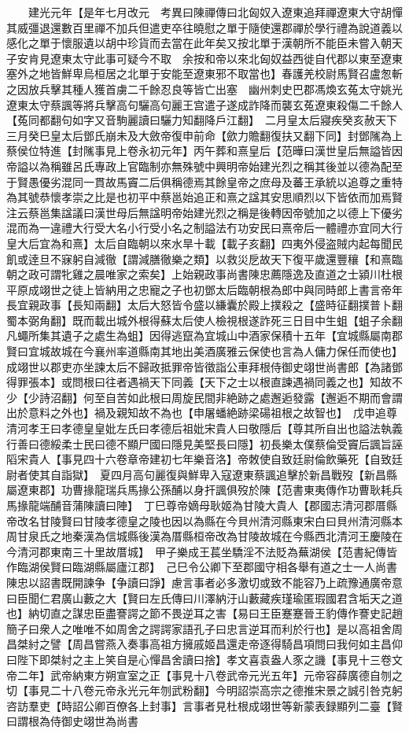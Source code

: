 　　建光元年【是年七月改元　考異曰陳禪傳曰北匈奴入遼東追拜禪遼東大守胡憚其威彊退還數百里禪不加兵但遣吏卒往曉慰之單于隨使還郡禪於學行禮為說道義以感化之單于懷服遺以胡中珍貨而去當在此年矣又按北單于漢朝所不能臣未嘗入朝天子安肯見遼東太守此事可疑今不取　余按和帝以來北匈奴益西徙自代郡以東至遼東塞外之地皆鮮卑烏桓居之北單于安能至遼東邪不取當也】春護羌校尉馬賢召盧怱斬之因放兵擊其種人獲首虜二千餘忍良等皆亡出塞　幽州刺史巴郡馮煥玄菟太守姚光遼東太守蔡諷等將兵擊高句驪高句麗王宫遣子遂成詐降而襲玄菟遼東殺傷二千餘人【菟同都翻句如字又音駒麗讀曰驪力知翻降戶江翻】　二月皇太后寢疾癸亥赦天下三月癸巳皇太后鄧氏崩未及大斂帝復申前命【歛力贍翻復扶又翻下同】封鄧隲為上蔡侯位特進【封隲事見上卷永初元年】丙午葬和熹皇后【范曄曰漢世皇后無謚皆因帝謚以為稱雖呂氏專政上官臨制亦無殊號中興明帝始建光烈之稱其後並以德為配至于賢愚優劣混同一貫故馬竇二后俱稱德焉其餘皇帝之庶母及蕃王承統以追尊之重特為其號恭懷孝崇之比是也初平中蔡邕始追正和熹之諡其安思順烈以下皆依而加焉賢注云蔡邕集諡議曰漢世母后無諡明帝始建光烈之稱是後轉因帝號加之以德上下優劣混而為一違禮大行受大名小行受小名之制謚法冇功安民曰熹帝后一體禮亦宜同大行皇大后宜為和熹】太后自臨朝以來水旱十載【載子亥翻】四夷外侵盗賊内起每聞民飢或逹旦不寐躬自減徹【謂減膳徹樂之類】以救災戹故天下復平歲還豐穰【和熹臨朝之政可謂牝雞之晨唯家之索矣】上始親政事尚書陳忠薦隱逸及直道之士潁川杜根平原成翊世之徒上皆納用之忠寵之子也初鄧太后臨朝根為郎中與同時郎上書言帝年長宜親政事【長知兩翻】太后大怒皆令盛以縑囊於殿上撲殺之【盛時征翻撲普卜翻蜀本弼角翻】既而載出城外根得蘇太后使人檢視根遂詐死三日目中生蛆【蛆子余翻凡蠅所集其遺子之處生為蛆】因得逃竄為宜城山中酒家保積十五年【宜城縣屬南郡賢曰宜城故城在今襄州率道縣南其地出美酒廣雅云保使也言為人傭力保任而使也】成翊世以郡吏亦坐諫太后不歸政抵罪帝皆徵詣公車拜根侍御史翊世尚書郎【為諸鄧得罪張本】或問根曰往者遇禍天下同義【天下之士以根直諫遇禍同義之也】知故不少【少詩沼翻】何至自苦如此根曰周旋民間非絶跡之處邂逅發露【邂逅不期而會謂出於意料之外也】禍及親知故不為也【申屠蟠絶跡梁碭祖根之故智也】　戊申追尊清河孝王曰孝德皇皇妣左氏曰孝德后祖妣宋貴人曰敬隱后【尊其所自出也謚法執義行善曰德綏柔士民曰德不顯尸國曰隱見美堅長曰隱】初長樂太僕蔡倫受竇后諷旨誣䧟宋貴人【事見四十六卷章帝建初七年樂音洛】帝敇使自致廷尉倫飲藥死【自致廷尉者使其自詣獄】　夏四月高句麗復與鮮卑入寇遼東蔡諷追擊於新昌戰歿【新昌縣屬遼東郡】功曹掾龍瑞兵馬掾公孫酺以身扞諷俱歿於陳【范書東夷傳作功曹耿耗兵馬掾龍端酺音蒲陳讀曰陣】　丁巳尊帝嫡母耿姬為甘陵大貴人【郡國志清河郡厝縣帝改名甘陵賢曰甘陵孝德皇之陵也因以為縣在今貝州清河縣東宋白曰貝州清河縣本周甘泉氏之地秦漢為信城縣後漢為厝縣桓帝改為甘陵故城在今縣西北清河王慶陵在今清河郡東南三十里故厝城】　甲子樂成王萇坐驕淫不法貶為蕪湖侯【范書紀傳皆作臨湖侯賢曰臨湖縣屬廬江郡】　己巳令公卿下至郡國守相各舉有道之士一人尚書陳忠以詔書既開諫争【争讀曰諍】慮言事者必多激切或致不能容乃上疏豫通廣帝意曰臣聞仁君廣山藪之大【賢曰左氏傳曰川澤納汙山藪藏疾瑾瑜匿瑕國君含垢天之道也】納切直之謀忠臣盡謇諤之節不畏逆耳之害【易曰王臣蹇蹇晉王豹傳作謇史記趙簡子曰衆人之唯唯不如周舍之諤諤家語孔子曰忠言逆耳而利於行也】是以高祖舍周昌桀紂之譬【周昌嘗燕入奏事高祖方擁戚姬昌還走帝逐得騎昌項問曰我何如主昌仰曰陛下即桀紂之主上笑自是心憚昌舍讀曰捨】孝文喜袁盎人豕之譏【事見十三卷文帝二年】武帝納東方朔宣室之正【事見十八卷武帝元光五年】元帝容薛廣德自刎之切【事見二十八卷元帝永光元年刎武粉翻】今明詔崇高宗之德推宋景之誠引咎克躬咨訪羣吏【時詔公卿百僚各上封事】言事者見杜根成翊世等新蒙表録顯列二臺【賢曰謂根為侍御史翊世為尚書